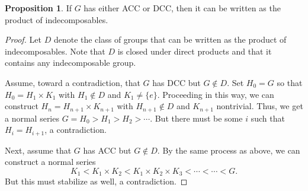 \documentclass[10pt,letterpaper,cm]{nupset}
\theoremstyle{definition}
\theoremstyle{theorem}
\newtheorem{prop}[definition]{Proposition}
\theoremstyle{remark}
\newcommand{\1}{\mathbf{1}}
\newcommand{\0}{\vec 0}
\newcommand{\dcc}{\textsf{DCC}\xspace}
\newcommand{\acc}{\textsf{ACC}\xspace}
\begin{document}
\begin{prop}\label{lp}
If $G$ has either \acc or \dcc, then it can be written as the product of indecomposables.
\end{prop}
\begin{proof}
Let $D$ denote the class of groups that can be written as the product of indecomposables. Note that $D$ is closed under direct products and that it contains any indecomposable group. 

\smallskip

 Assume, toward a contradiction, that $G$ has \dcc but $G \notin D$. Set $H_0 = G$ so that $H_0 = H_1 \times K_1$ with $H_1 \notin D$ and $K_1 \ne \{e\}$. Proceeding in this way, we can construct $H_n = H_{n+1} \times K_{n+1}$ with $H_{n+1} \notin D$ and $K_{n+1}$ nontrivial. Thus, we get a normal series $G= H_0 > H_1 > H_2 > \cdots$. But there must be some $i$ such that $H_i = H_{i+1}$, a contradiction.

\smallskip

 Next, assume that $G$ has \acc but $G \notin D$. By the same process as above, we can construct a normal series $$K_1 < K_1 \times K_2 < K_1 \times K_2 \times K_3 < \cdots < \cdots < G.$$ But this must stabilize as well, a contradiction.
\end{proof}
\end{document}
